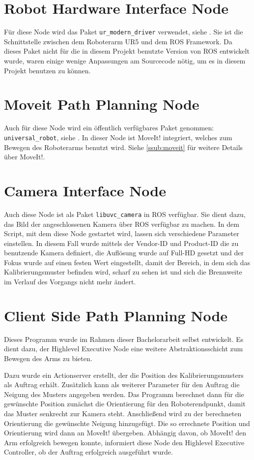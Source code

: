 \section{Robot Hardware Interface Node} %
\label{sec:ur_modern_driver}
Für diese Node wird das Paket \texttt{ur\_modern\_driver} verwendet, siehe \cite{ur_modern_driver}. Sie ist die Schnittstelle zwischen dem Roboterarm UR5 und dem ROS Framework. Da dieses Paket nicht für die in diesem Projekt benutzte Version von ROS entwickelt wurde, waren einige wenige Anpassungen am Sourcecode nötig, um es in diesem Projekt benutzen zu können.

\section{Moveit Path Planning Node} %
\label{sec:universal_robot}
Auch für diese Node wird ein öffentlich verfügbares Paket genommen: \texttt{universal\_robot}, siehe \cite{universal_robot}. In dieser Node ist MoveIt! integriert, welches zum Bewegen des Roboterarms benutzt wird. Siehe \autoref{ssub:moveit} für weitere Details über MoveIt!.

\section{Camera Interface Node} %
\label{sec:libuvc_camera}
Auch diese Node ist als Paket \texttt{libuvc\_camera} in ROS verfügbar. Sie dient dazu, das Bild der angeschlossenen Kamera über ROS verfügbar zu machen. In dem Script, mit dem diese Node gestartet wird, lassen sich verschiedene Parameter einstellen. In diesem Fall wurde mittels der Vendor-ID und Product-ID die zu benutzende Kamera definiert, die Auflösung wurde auf Full-HD gesetzt und der Fokus wurde auf einen festen Wert eingestellt, damit der Bereich, in dem sich das Kalibrierungsmuster befinden wird, scharf zu sehen ist und sich die Brennweite im Verlauf des Vorgangs nicht mehr ändert.

\section{Client Side Path Planning Node} %
\label{sec:movearmserver}
Dieses Programm wurde im Rahmen dieser Bachelorarbeit selbst entwickelt. Es dient dazu, der Highlevel Executive Node eine weitere Abstraktionsschicht zum Bewegen des Arms zu bieten.

Dazu wurde ein Actionserver erstellt, der die Position des Kalibrierungsmusters als Auftrag erhält. Zusätzlich kann als weiterer Parameter für den Auftrag die Neigung des Musters angegeben werden. Das Programm berechnet dann für die gewünschte Position zunächst die Orientierung für den Roboterendpunkt, damit das Muster senkrecht zur Kamera steht. Anschließend wird zu der berechneten Orientierung die gewünschte Neigung hinzugefügt. Die so errechnete Position und Orientierung wird dann an MoveIt! übergeben. Abhängig davon, ob MoveIt! den Arm erfolgreich bewegen konnte, informiert diese Node den Highlevel Executive Controller, ob der Auftrag erfolgreich ausgeführt wurde.

